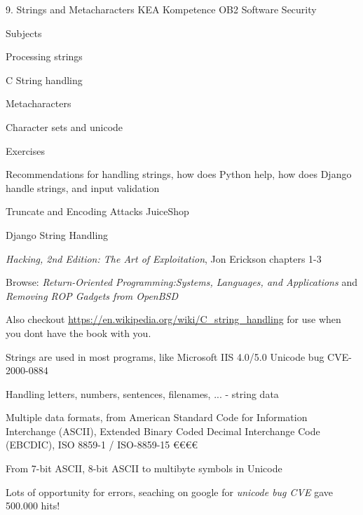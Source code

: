 \documentclass[Screen16to9,17pt]{foils}
\begin{document}
\mytitlepage
{9. Strings and Metacharacters}
{KEA Kompetence OB2 Software Security}


\begin{list1}
\item Subjects
\begin{list2}
\item Processing strings
\item C String handling
\item Metacharacters
\item Character sets and unicode
\end{list2}
\item Exercises
\begin{list2}
\item Recommendations for handling strings, how does Python help, how does Django handle strings, and input validation
\item Truncate and Encoding Attacks JuiceShop
\item Django String Handling
\end{list2}
\end{list1}


\begin{list1}
\item \emph{Hacking, 2nd Edition: The Art of Exploitation}, Jon Erickson chapters 1-3
\item Browse: \emph{Return-Oriented Programming:Systems, Languages, and Applications} and \emph{Removing ROP Gadgets from OpenBSD}
\end{list1}

Also checkout \url{https://en.wikipedia.org/wiki/C_string_handling}
for use when you dont have the book with you.



\begin{list1}
\item Strings are used in most programs, like Microsoft IIS 4.0/5.0 Unicode bug CVE-2000-0884
\item Handling letters, numbers, sentences, filenames, ... - string data
\item Multiple data formats, from American Standard Code for Information Interchange (ASCII), Extended Binary Coded Decimal Interchange Code (EBCDIC), ISO 8859-1 / ISO-8859-15 €€€€
\item From 7-bit ASCII, 8-bit ASCII to multibyte symbols in Unicode
\item Lots of opportunity for errors, seaching on google for \emph{unicode bug CVE} gave 500.000 hits!
\end{list1}
\end{document}
